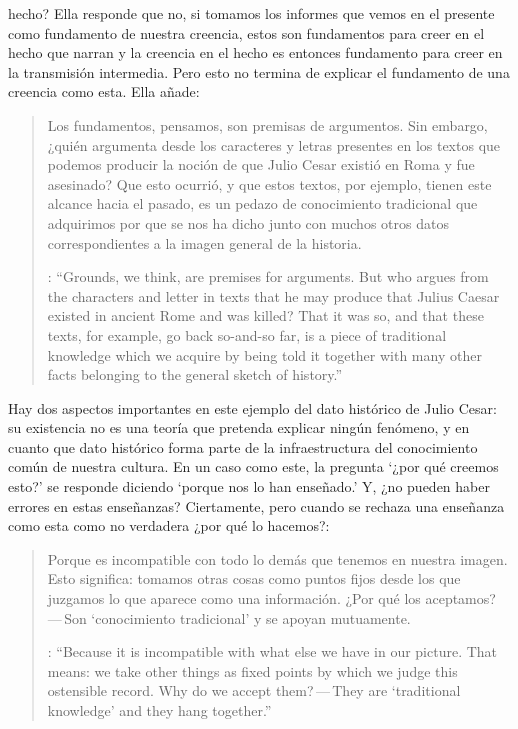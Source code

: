 hecho? Ella responde que no, si tomamos los informes que vemos en el presente como fundamento de nuestra creencia, estos son fundamentos para creer en el hecho que narran y la creencia en el hecho es entonces fundamento para creer en la transmisión intermedia. Pero esto no termina de explicar el fundamento de una creencia como esta. Ella añade: \blockquote[{\cite[182]{anscombe2015logic:grounds}}: \enquote{Grounds, we think, are premises for arguments. But who argues from the characters and letter in texts that he may produce that Julius Caesar existed in ancient Rome and was killed? That it was so, and that these texts, for example, go back so-and-so far, is a piece of traditional knowledge which we acquire by being told it together with many other facts belonging to the general sketch of history.}]{Los fundamentos, pensamos, son premisas de argumentos. Sin embargo, ¿quién argumenta desde los caracteres y letras presentes en los textos que podemos producir la noción de que Julio Cesar existió en Roma y fue asesinado? Que esto ocurrió, y que estos textos, por ejemplo, tienen este alcance hacia el pasado, es un pedazo de conocimiento tradicional que adquirimos por que se nos ha dicho junto con muchos otros datos correspondientes a la imagen general de la historia.} Hay dos aspectos importantes en este ejemplo del dato histórico de Julio Cesar: su existencia no es una teoría que pretenda explicar ningún fenómeno, y en cuanto que dato histórico forma parte de la infraestructura del conocimiento común de nuestra cultura. En un caso como este, la pregunta \enquote*{¿por qué creemos esto?} se responde diciendo \enquote*{porque nos lo han enseñado.} Y, ¿no pueden haber errores en estas enseñanzas? Ciertamente, pero cuando se rechaza una enseñanza como esta como no verdadera ¿por qué lo hacemos?: \blockquote[{\cite[182]{anscombe2015logic:grounds}}: \enquote{Because it is incompatible with what else we have in our picture. That means: we take other things as fixed points by which we judge this ostensible record. Why do we accept them?\,---\,They are `traditional knowledge' and they hang together.}]{Porque es incompatible con todo lo demás que tenemos en nuestra imagen. Esto significa: tomamos otras cosas como puntos fijos desde los que juzgamos lo que aparece como una información. ¿Por qué los aceptamos?\,---\,Son `conocimiento tradicional' y se apoyan mutuamente.}

